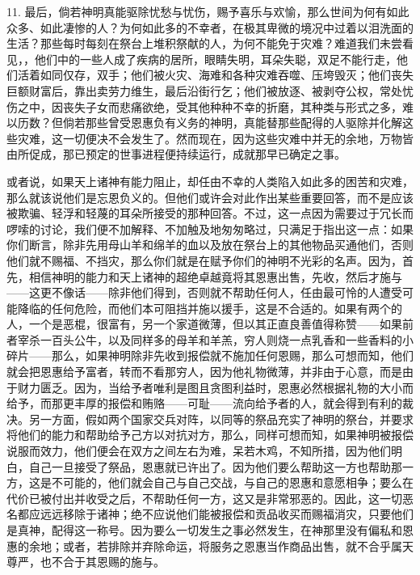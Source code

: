 11. 最后，倘若神明真能驱除忧愁与忧伤，赐予喜乐与欢愉，那么世间为何有如此众多、如此凄惨的人？为何如此多的不幸者，在极其卑微的境况中过着以泪洗面的生活？那些每时每刻在祭台上堆积祭献的人，为何不能免于灾难？难道我们未尝看见，，他们中的一些人成了疾病的居所，眼睛失明，耳朵失聪，双足不能行走，他们活着如同仅存，双手；他们被火灾、海难和各种灾难吞噬、压垮毁灭；他们丧失巨额财富后，靠出卖劳力维生，最后沿街行乞；他们被放逐、被剥夺公权，常处忧伤之中，因丧失子女而悲痛欲绝，受其他种种不幸的折磨，其种类与形式之多，难以历数？但倘若那些曾受恩惠负有义务的神明，真能替那些配得的人驱除并化解这些灾难，这一切便决不会发生了。然而现在，因为这些灾难中并无的余地，万物皆由所促成，那已预定的世事进程便持续运行，成就那早已确定之事。\par

或者说，如果天上诸神有能力阻止，却任由不幸的人类陷入如此多的困苦和灾难，那么就该说他们是忘恩负义的。但他们或许会对此作出某些重要回答，而不是应该被欺骗、轻浮和轻蔑的耳朵所接受的那种回答。不过，这一点因为需要过于冗长而啰嗦的讨论，我们便不加解释、不加触及地匆匆略过，只满足于指出这一点：如果你们断言，除非先用母山羊和绵羊的血以及放在祭台上的其他物品买通他们，否则他们就不赐福、不挡灾，那么你们就是在赋予你们的神明不光彩的名声。因为，首先，相信神明的能力和天上诸神的超绝卓越竟将其恩惠出售，先收，然后才施与——这更不像话——除非他们得到，否则就不帮助任何人，任由最可怜的人遭受可能降临的任何危险，而他们本可阻挡并施以援手，这是不合适的。如果有两个的人，一个是恶棍，很富有，另一个家道微薄，但以其正直良善值得称赞——如果前者宰杀一百头公牛，以及同样多的母羊和羊羔，穷人则烧一点乳香和一些香料的小碎片——那么，如果神明除非先收到报偿就不施加任何恩赐，那么可想而知，他们就会把恩惠给予富者，转而不看那穷人，因为他礼物微薄，并非由于心意，而是由于财力匮乏。因为，当给予者唯利是图且贪图利益时，恩惠必然根据礼物的大小而给予，而那更丰厚的报偿和贿赂——可耻——流向给予者的人，就会得到有利的裁决。另一方面，假如两个国家交兵对阵，以同等的祭品充实了神明的祭台，并要求将他们的能力和帮助给予己方以对抗对方，那么，同样可想而知，如果神明被报偿说服而效力，他们便会在双方之间左右为难，呆若木鸡，不知所措，因为他们明白，自己一旦接受了祭品，恩惠就已许出了。因为他们要么帮助这一方也帮助那一方，这是不可能的，他们就会自己与自己交战，与自己的恩惠和意愿相争；要么在代价已被付出并收受之后，不帮助任何一方，这又是非常邪恶的。因此，这一切恶名都应远远移除于诸神；绝不应说他们能被报偿和贡品收买而赐福消灾，只要他们是真神，配得这一称号。因为要么一切发生之事必然发生，在神那里没有偏私和恩惠的余地；或者，若排除并弃除命运，将服务之恩惠当作商品出售，就不合乎属天尊严，也不合于其恩赐的施与。\par

